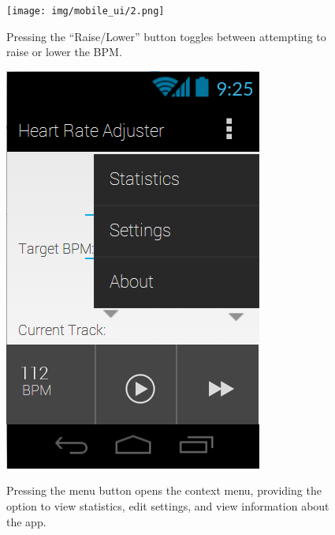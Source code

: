 \documentclass[letterpaper,english, 12pt]{scrreprt}
\begin{document}
\begin{figure}[H]
	\centering
	\texttt{[image: img/mobile\_ui/2.png]}\\
	\caption{Pressing the ``Raise/Lower'' button toggles between attempting to raise or lower the BPM.}
\end{figure}

\begin{figure}[H]
	\centering
	\includegraphics{img/mobile_ui/3.png}\\
	\caption{Pressing the menu button opens the context menu, providing the option to view statistics, edit settings, and view information about the app.}
\end{figure}
\end{document}
